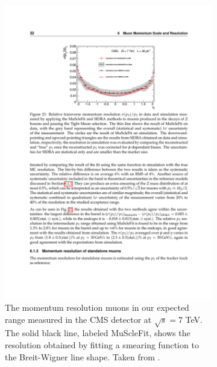     \begin{figure}[!htb]
      \centering
      \begin{subfigure}[t]{0.48\textwidth}
        \includegraphics[width=\textwidth]{figures/muon_E_resolution.pdf}
        \caption{The momentum resolution muons in our expected \pt range measured in the CMS detector at $\sqrt{s} = 7$ TeV. The solid black line, labeled MuScleFit, shows the resolution obtained by fitting a smearing function\cite[sec. 6.1]{cms_muons} to the Breit-Wigner line shape. Taken from \cite{cms_muons}.}
        \label{fig:muon_E_resolution}
      \end{subfigure}
      \quad
      \begin{subfigure}[t]{0.48\textwidth}

\end{subfigure}
\end{figure}
